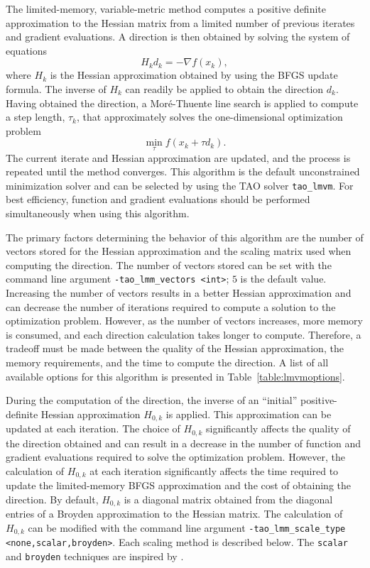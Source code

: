The limited-memory, variable-metric method computes a positive definite
approximation to the Hessian matrix from a limited number of previous
iterates and gradient evaluations.  A direction is then obtained by
solving the system of equations
\[
H_k d_k = -\nabla f(x_k),
\]
where $H_k$ is the Hessian approximation obtained by using the BFGS update 
formula.  The inverse of $H_k$ can readily be applied to obtain the 
direction $d_k$.  Having obtained the direction, a Mor\'{e}-Thuente 
line search is applied to compute a step length, $\tau_k$, that 
approximately solves the one-dimensional optimization problem
\[
\min_\tau f(x_k + \tau d_k).
\]
The current iterate and Hessian approximation are updated, and the process
is repeated until the method converges.  This algorithm is the default 
unconstrained minimization solver and can be selected by using the 
TAO solver {\tt tao\_lmvm}.  For best efficiency, function and gradient 
evaluations should be performed simultaneously when using this algorithm.

The primary factors determining the behavior of this algorithm are the 
number of vectors stored for the Hessian approximation and the scaling matrix
used when computing the direction.  The number of vectors stored can be set
with the command line argument {\tt -tao\_lmm\_vectors <int>}; $5$ is the 
default 
value.  Increasing the number of vectors results in a better Hessian 
approximation and can decrease the number of iterations required to compute
a solution to the optimization problem.  However, as the number of vectors
increases, more memory is consumed, and each direction calculation takes
longer to compute.  Therefore, a tradeoff must be made between the 
quality of the Hessian approximation, the memory requirements, and
the time to compute the direction.  A list of all available options
for this algorithm is presented in Table~\ref{table:lmvmoptions}.

During the computation of the direction, the inverse of an ``initial''
positive-definite Hessian approximation $H_{0,k}$ is applied.  This 
approximation can be updated at each iteration.  The choice of $H_{0,k}$
significantly affects the quality of the direction obtained
and can result in a decrease in the number of function and gradient 
evaluations required to solve the optimization problem.  However,
the calculation of $H_{0,k}$ at each iteration significantly 
affects the time required to update the limited-memory BFGS 
approximation and the cost of obtaining the direction.  By default, 
$H_{0,k}$ is a diagonal matrix obtained from the diagonal entries
of a Broyden approximation to the Hessian matrix.  The calculation
of $H_{0,k}$ can be modified with the command line argument 
{\tt -tao\_lmm\_scale\_type <none,scalar,broyden>}.  Each scaling 
method is described below.  The {\tt scalar} and {\tt broyden} 
techniques are inspired by \cite{Gilbert-Lemarechal}.

